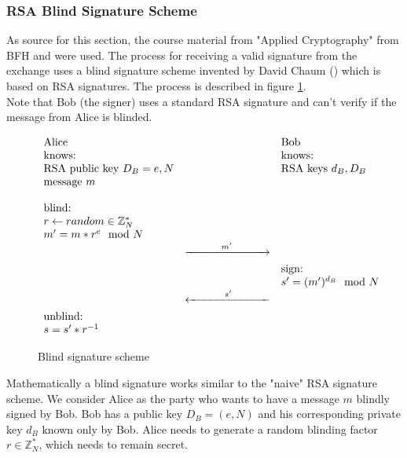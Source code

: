 \subsubsection{RSA Blind Signature Scheme}
\label{sec:blind-rsa-sign}
As source for this section, the course material from "Applied Cryptography" from BFH and \cite{chaum:blind-sign} were used.
The process for receiving a valid signature from the exchange uses a blind signature scheme invented by David Chaum (\cite{chaum:blind-sign}) which is based on RSA signatures.
The process is described in figure \ref{fig:blind-sign}.
\\Note that Bob (the signer) uses a standard RSA signature and can't verify if the message from Alice is blinded.
\begin{figure}[htp]
    \begin{equation*}
        \begin{array}{ l c l }
            \text{Alice} &  & \text{Bob}
            \\ \text{knows:} & & \text{knows:}
            \\ \text{RSA public key } D_B = e, N & & \text{RSA keys } d_B, D_B
            \\ \text{message } m & &
            \\ & &
            \\ \text{blind:} & &
            \\ r \leftarrow random \in \mathbb{Z}_N^* & &
            \\ m' = m*r^{e} \mod N & &
            \\ & \xrightarrow[\rule{2.5cm}{0pt}]{m'} &
            \\ & & \text{sign:}
            \\ & & s' = (m')^{d_B} \mod N
            \\ & \xleftarrow[\rule{2.5cm}{0pt}]{s'} &
            \\ \text{unblind:}& &
            \\ s = s'*r^{-1} & &
        \end{array}
    \end{equation*}
    \caption{Blind signature scheme}
    \label{fig:blind-sign}
\end{figure}
Mathematically a blind signature works similar to the "naive" RSA signature scheme.
We consider Alice as the party who wants to have a message $m$ blindly signed by Bob.
Bob has a public key $D_B = (e, N)$ and his corresponding private key $d_B$ known only by Bob.
Alice needs to generate a random blinding factor $r\in \mathbb{Z}_N^*$, which needs to remain secret.
